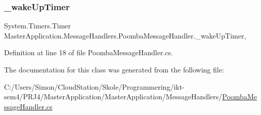 \subsubsection{\texorpdfstring{\+\_\+wake\+Up\+Timer}{\_wakeUpTimer}}
{\footnotesize\ttfamily System.\+Timers.\+Timer Master\+Application.\+Message\+Handlers.\+Poomba\+Message\+Handler.\+\_\+wake\+Up\+Timer\hspace{0.3cm}{\ttfamily [static]}, {\ttfamily [private]}}



Definition at line 18 of file Poomba\+Message\+Handler.\+cs.



The documentation for this class was generated from the following file\+:\begin{DoxyCompactItemize}
\item 
C\+:/\+Users/\+Simon/\+Cloud\+Station/\+Skole/\+Programmering/ikt-\/sem4/\+P\+R\+J4/\+Master\+Application/\+Master\+Application/\+Message\+Handlers/\mbox{\hyperlink{_poomba_message_handler_8cs}{Poomba\+Message\+Handler.\+cs}}\end{DoxyCompactItemize}
